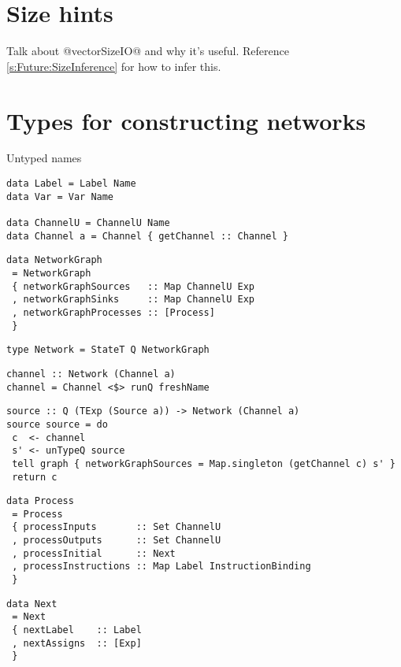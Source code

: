 \section{Size hints}
\label{s:implementation:sizehints}
Talk about @vectorSizeIO@ and why it's useful.
Reference \autoref{s:Future:SizeInference} for how to infer this.

\section{Types for constructing networks}

Untyped names
\begin{lstlisting}
data Label = Label Name
data Var = Var Name

data ChannelU = ChannelU Name
data Channel a = Channel { getChannel :: Channel }
\end{lstlisting}


\begin{lstlisting}
data NetworkGraph
 = NetworkGraph
 { networkGraphSources   :: Map ChannelU Exp
 , networkGraphSinks     :: Map ChannelU Exp
 , networkGraphProcesses :: [Process]
 }
\end{lstlisting}

\begin{lstlisting}
type Network = StateT Q NetworkGraph
\end{lstlisting}

\begin{lstlisting}
channel :: Network (Channel a)
channel = Channel <$> runQ freshName
\end{lstlisting}

\begin{lstlisting}
source :: Q (TExp (Source a)) -> Network (Channel a)
source source = do
 c  <- channel
 s' <- unTypeQ source
 tell graph { networkGraphSources = Map.singleton (getChannel c) s' }
 return c
\end{lstlisting}


\begin{lstlisting}
data Process
 = Process
 { processInputs       :: Set ChannelU
 , processOutputs      :: Set ChannelU
 , processInitial      :: Next
 , processInstructions :: Map Label InstructionBinding
 }
\end{lstlisting}

\begin{lstlisting}
data Next
 = Next
 { nextLabel    :: Label
 , nextAssigns  :: [Exp]
 }
\end{lstlisting}

